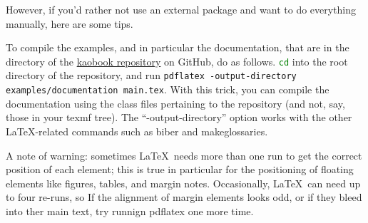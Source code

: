 However, if you'd rather not use an external package and want to do 
everything manually, here are some tips.

To compile the examples, and in particular the documentation, that are 
in the  directory of the 
\href{https://github.com/fmarotta/kaobook}{kaobook repository} on 
GitHub, do as follows. \lstinline[language=bash]|cd| into the root 
directory of the repository, and run
\lstinline|pdflatex -output-directory examples/documentation main.tex|. 
With this trick, you can compile the documentation using the class files 
pertaining to the repository (and not, say, those in your texmf tree). 
The \enquote{-output-directory} option works with the other 
\LaTeX-related commands such as biber and makeglossaries.

A note of warning: sometimes \LaTeX\ needs more than one run to get the
correct position of each element; this is true in particular for the
positioning of floating elements like figures, tables, and margin notes.
Occasionally, \LaTeX\ can need up to four re-runs, so If the alignment
of margin elements looks odd, or if they bleed into ther main text, try
runnign pdflatex one more time.
